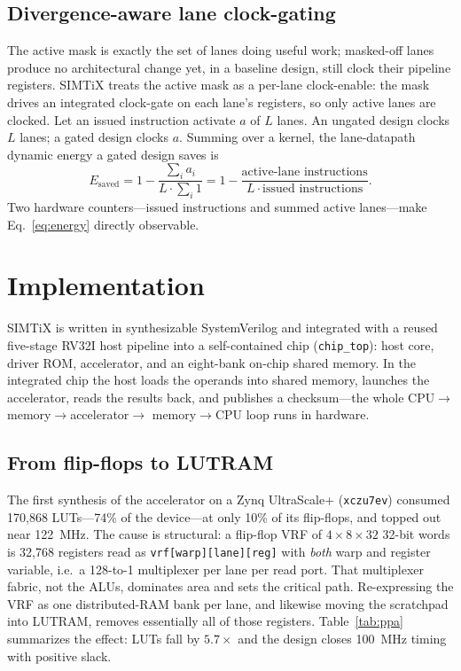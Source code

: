 \documentclass[conference]{IEEEtran}
\begin{document}
\subsection{Divergence-aware lane clock-gating}\label{sec:gating}
The active mask is exactly the set of lanes doing useful work; masked-off lanes
produce no architectural change yet, in a baseline design, still clock their
pipeline registers. SIMTiX treats the active mask as a per-lane clock-enable: the
mask drives an integrated clock-gate on each lane's registers, so only active
lanes are clocked. Let an issued instruction activate $a$ of $L$ lanes. An
ungated design clocks $L$ lanes; a gated design clocks $a$. Summing over a
kernel, the lane-datapath dynamic energy a gated design saves is
\begin{equation}
E_{\text{saved}} = 1 - \frac{\sum_i a_i}{L \cdot \sum_i 1}
                 = 1 - \frac{\text{active-lane instructions}}{L \cdot \text{issued instructions}} .
\label{eq:energy}
\end{equation}
Two hardware counters---issued instructions and summed active lanes---make
Eq.~\eqref{eq:energy} directly observable.

\section{Implementation}\label{sec:impl}
SIMTiX is written in synthesizable SystemVerilog and integrated with a reused
five-stage RV32I host pipeline into a self-contained chip
(\texttt{chip\_top}): host core, driver ROM, accelerator, and an eight-bank
on-chip shared memory. In the integrated chip the host loads the operands into
shared memory, launches the accelerator, reads the results back, and publishes a
checksum---the whole CPU$\rightarrow$memory$\rightarrow$accelerator$\rightarrow$
memory$\rightarrow$CPU loop runs in hardware.

\subsection{From flip-flops to LUTRAM}
The first synthesis of the accelerator on a Zynq UltraScale+
(\texttt{xczu7ev}) consumed 170{,}868 LUTs---74\% of the device---at only 10\%
of its flip-flops, and topped out near 122~MHz. The cause is structural: a
flip-flop VRF of $4\times8\times32$ 32-bit words is 32{,}768 registers read as
\texttt{vrf[warp][lane][reg]} with \emph{both} warp and register variable, i.e.\
a 128-to-1 multiplexer per lane per read port. That multiplexer fabric, not the
ALUs, dominates area and sets the critical path. Re-expressing the VRF as one
distributed-RAM bank per lane, and likewise moving the scratchpad into LUTRAM,
removes essentially all of those registers. Table~\ref{tab:ppa} summarizes the
effect: LUTs fall by $5.7\times$ and the design closes 100~MHz timing with
positive slack.
\end{document}
